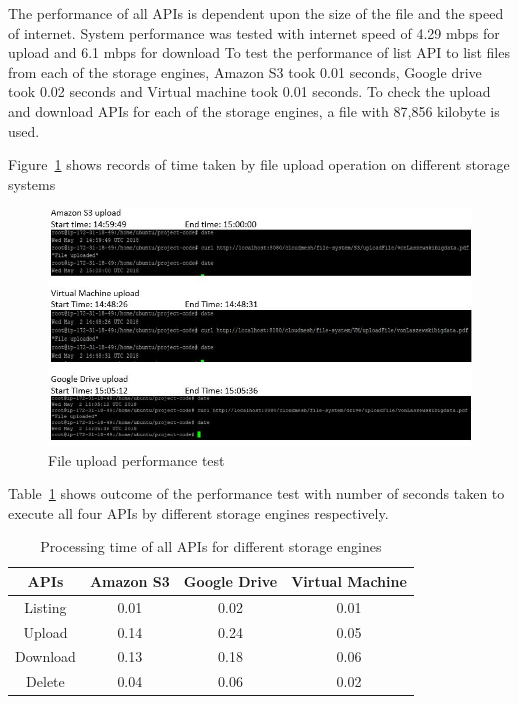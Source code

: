 The performance of all APIs is dependent upon the size of the file and
the speed of internet. System performance was tested with internet
speed of 4.29 mbps for upload and 6.1 mbps for download To test the
performance of list API to list files from each of the storage
engines, Amazon S3 took 0.01 seconds, Google drive took 0.02 seconds
and Virtual machine took 0.01 seconds.  To check the upload and
download APIs for each of the storage engines, a file with 87,856
kilobyte is used.

Figure~\ref{fig:upload-test} shows records of time taken 
by file upload operation on different storage systems

\begin{figure}[!ht]
        \centering\includegraphics[width=\columnwidth]
        {image/upload-test.JPG}
        \caption{File upload performance test}\label{fig:upload-test}
\end{figure}


Table~\ref{tab:timing} shows outcome of the performance test 
with number of seconds taken to execute all four APIs by different 
storage engines respectively.

\begin{table}[htb]
	\centering
  \caption{Processing time of all APIs for different storage 
  engines}\label{tab:timing}

	\begin{tabular}{*{4}{c}}
		\toprule
		APIs & Amazon S3 & Google Drive & Virtual Machine \\
		\midrule
		Listing & 0.01  & 0.02 & 0.01 \\
		Upload & 0.14 & 0.24 & 0.05 \\
        Download & 0.13 & 0.18 & 0.06 \\
        Delete & 0.04 & 0.06 & 0.02 \\
		\bottomrule
	\end{tabular}
\end{table}




